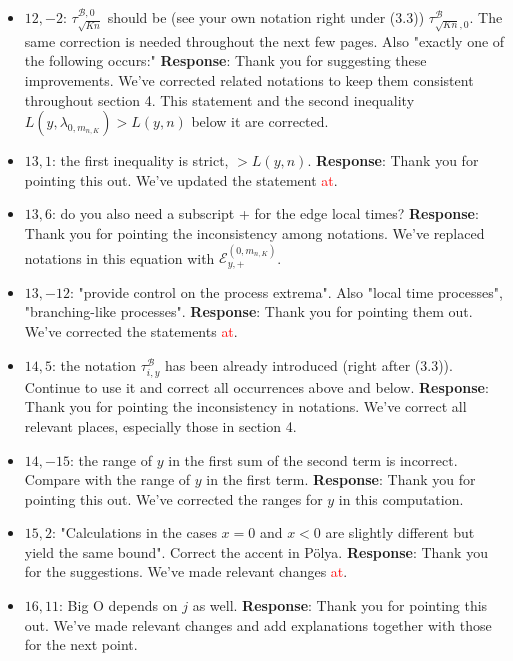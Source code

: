 \documentclass[11pt,a4paper]{article}
\numberwithin{equation}{section}
\def\TBF#1{\textcolor{red}{#1}} %
\begin{document}
\begin{itemize}
		
		\item 
		$12,-2$: $\tau^{\mathcal{B},0}_{\sqrt{Kn}}$ should be (see your own notation right under (3.3)) $\tau^{\mathcal{B}}_{\sqrt{Kn},0}$. The same correction is
		needed throughout the next few pages. Also "exactly one of the following occurs:"
		\subitem \textbf{Response}:  Thank you for suggesting these improvements. We've corrected related notations to keep them consistent throughout section 4. This statement and the second inequality $L(y, \lambda_{0,m_{n,K}} )>L(y,n)$ below it are corrected.
		
		\item 
		$13,1$: the first inequality is strict, $> L(y, n)$.
		\subitem \textbf{Response}: Thank you for pointing this out.  We've updated the statement \TBF{at}.
		
		\item 
		$13,6$: do you also need a subscript + for the edge local times?
		\subitem \textbf{Response}: Thank you for pointing the inconsistency among notations. We've replaced notations in this equation with $\mathcal{E}_{y,+}^{(0,m_{n,K})}  $.
		
		\item 
		$13,-12$: "provide control on the process extrema". Also "local time processes", "branching-like processes".
		\subitem \textbf{Response}: Thank you for pointing them out.  We've corrected the statements \TBF{at}. 
		
		\item 
		$14,5$: the notation $\tau^{\mathcal{B}}_{i,y}$ has been already introduced (right after (3.3)). Continue to use it and correct all occurrences above and below.
		\subitem \textbf{Response}: Thank you for pointing the inconsistency in notations. We've correct all relevant places, especially those in section 4. 
		
		\item 
		$14,-15$: the range of $y$ in the first sum of the second term is incorrect. Compare with the range of $y$ in the first term.
		\subitem \textbf{Response}: Thank you for pointing this out. We've corrected the ranges for $y$ in this computation.
		
		\item
		$15,2$: "Calculations in the cases $x = 0$ and $x < 0$ are slightly different but yield the same bound". Correct the accent in P\"{o}lya.
		\subitem \textbf{Response}:
		Thank you for the suggestions. We've made relevant changes \TBF{at}.
		
		\item 
		$16,11$: Big O depends on $j$ as well.
		\subitem \textbf{Response}: Thank you for pointing this out. We've made relevant changes and add explanations together with those for the next point.
		

\end{itemize}
\end{document}
